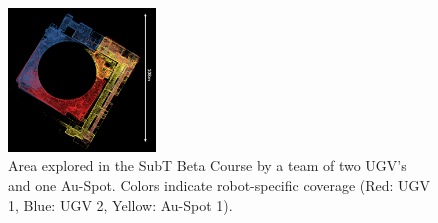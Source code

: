 \documentclass[letterpaper, 10pt, conference]{ieeeconf}      %
\newcommand{\rev}[1]{{\color{blue}#1}} %
\begin{document}











\begin{figure}[t!]
  \centering
  \includegraphics[width=0.35\textwidth]{spot_iros/graphics/coverage_matteo.pdf}  %
  \caption{\rev{Area explored in the SubT Beta Course by a team of two UGV's and one Au-Spot. Colors indicate robot-specific coverage (Red: UGV 1, Blue: UGV 2, Yellow: Au-Spot 1).}}
  \label{fig:exploration_planner_topview}
\end{figure}
\end{document}
